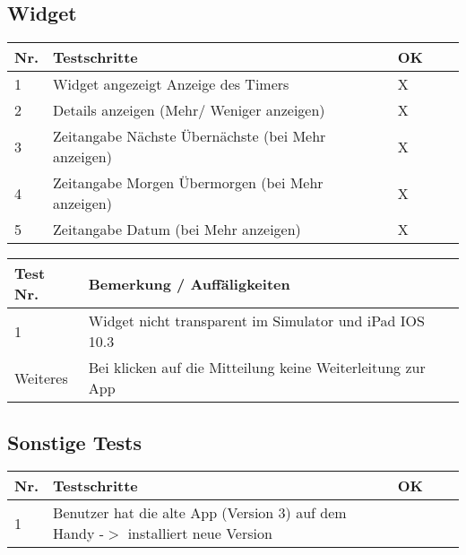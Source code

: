 \subsection{Widget}
\noindent%
\begin{tabularx}{\textwidth}{|p{}|p{}|X|X|X| }
\hline
\textbf{Nr.} &\textbf{Testschritte} &\textbf{OK}   \\ \hline 
1 & Widget angezeigt Anzeige des Timers & X     \\ \hline
2 & Details anzeigen (Mehr/ Weniger anzeigen) & X    \\ \hline
3 & Zeitangabe Nächste Übernächste (bei Mehr anzeigen) & X   \\ \hline
4 & Zeitangabe Morgen Übermorgen (bei Mehr anzeigen) & X  \\ \hline
5 & Zeitangabe Datum (bei Mehr anzeigen) & X  \\ \hline
\end{tabularx}
\newline
\newline

\noindent%
\begin{tabularx}{\textwidth}{|p{}|X|X| }
\hline
\textbf{Test Nr.} &\textbf{Bemerkung / Auffäligkeiten}   \\ \hline 
 1 & 
Widget nicht transparent im Simulator und iPad IOS 10.3  \\ \hline
Weiteres & 
Bei klicken auf die Mitteilung keine Weiterleitung zur App  \\ \hline
\end{tabularx}
\newline
\newline

\subsection{Sonstige Tests}

\noindent%
\begin{tabularx}{\textwidth}{|p{}|p{}|X|X|X| }
\hline
\textbf{Nr.} &\textbf{Testschritte} &\textbf{OK}   \\ \hline 

1 & Benutzer hat die alte App (Version 3) auf dem Handy -$>$ installiert neue Version &      \\ \hline

\end{tabularx}
\newline
